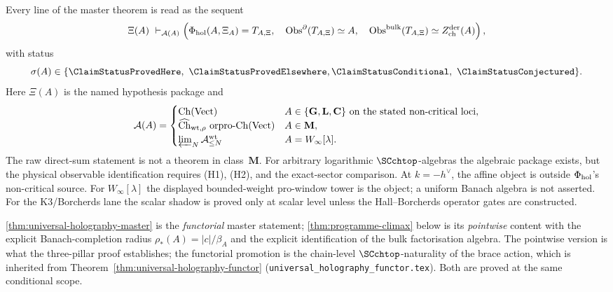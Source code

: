 \begin{remark}
\label{rem:universal-holography-sequent-form}
Every line of the master theorem is read as the sequent
\[
\Xi(A)\ \vdash_{\mathcal A(A)}
\left(
\Phi_{\mathrm{hol}}(A,\Xi_A)=T_{A,\Xi},\quad
\mathrm{Obs}^{\partial}(T_{A,\Xi})\simeq A,\quad
\mathrm{Obs}^{\mathrm{bulk}}(T_{A,\Xi})\simeq
Z^{\mathrm{der}}_{\mathrm{ch}}(A)
\right),
\]
with status
\[
\sigma(A)\in
\{\ClaimStatusProvedHere,\ \ClaimStatusProvedElsewhere,
\ClaimStatusConditional,\ \ClaimStatusConjectured\}.
\]
Here \(\Xi(A)\) is the named hypothesis package and
\[
\mathcal A(A)=
\begin{cases}
\mathrm{Ch}(\mathrm{Vect}) &
 A\in\{\mathbf G,\mathbf L,\mathbf C\}\ \text{on the stated
 non-critical loci},\\
\widehat{\mathrm{Ch}}_{\mathrm{wt},\rho}\ \text{or}
 \mathrm{pro}\text{-}\mathrm{Ch}(\mathrm{Vect}) &
 A\in\mathbf M,\\
\varprojlim_N\mathcal A_{\le N}^{\mathrm{wt}} &
 A=W_{\infty}[\lambda].
\end{cases}
\]
The raw direct-sum statement is not a theorem in class~\(\mathbf M\).
For arbitrary logarithmic \(\SCchtop\)-algebras the algebraic package
exists, but the physical observable identification requires \textup{(H1)},
\textup{(H2)}, and the exact-sector comparison.  At
\(k=-h^{\vee}\), the affine object is outside \(\Phi_{\mathrm{hol}}\)'s
non-critical source.  For \(W_{\infty}[\lambda]\) the displayed
bounded-weight pro-window tower is the object; a uniform Banach algebra
is not asserted.  For the K3/Borcherds lane the scalar shadow is proved
only at scalar level unless the Hall--Borcherds operator gates are
constructed.
\end{remark}

\begin{remark}
\cref{thm:universal-holography-master} is the \emph{functorial}
master statement; \cref{thm:programme-climax} below is its
\emph{pointwise} content with the explicit Banach-completion radius
$\rho_{*}(A) = |c|/\beta_{A}$ and the explicit identification of
the bulk factorisation algebra. The pointwise version is what the
three-pillar proof establishes; the functorial promotion is the
chain-level $\SCchtop$-naturality of the brace action, which is
inherited from
Theorem~\ref{thm:universal-holography-functor}
(\texttt{universal\_holography\_functor.tex}). Both are proved at
the same conditional scope.
\end{remark}


